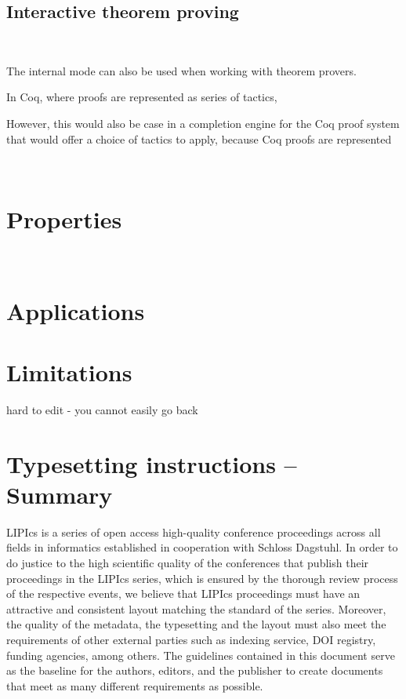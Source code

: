 \documentclass[a4paper,UKenglish,cleveref, autoref, thm-restate]{lipics-v2021}
\begin{document}
\newpage

\subsection{Interactive theorem proving}
~

The internal mode can also be used when
working with theorem provers.

In Coq, where proofs are represented as series of tactics,

However, this would also be case in a
completion engine for the Coq proof system that would offer a choice of tactics to apply, because
Coq proofs are represented

~

\newpage

\section{Properties}
\label{sec:properties}

~

\section{Applications}
\label{sec:applications}


\cite{rein-2019-exploratory}

\section{Limitations}

hard to edit - you cannot easily go back

\newpage



\newpage

\section{Typesetting instructions -- Summary}
\label{sec:typesetting-summary}

LIPIcs is a series of open access high-quality conference proceedings across all fields in informatics established in cooperation with Schloss Dagstuhl.
In order to do justice to the high scientific quality of the conferences that publish their proceedings in the LIPIcs series, which is ensured by the thorough review process of the respective events, we believe that LIPIcs proceedings must have an attractive and consistent layout matching the standard of the series.
Moreover, the quality of the metadata, the typesetting and the layout must also meet the requirements of other external parties such as indexing service, DOI registry, funding agencies, among others. The guidelines contained in this document serve as the baseline for the authors, editors, and the publisher to create documents that meet as many different requirements as possible.
\end{document}
